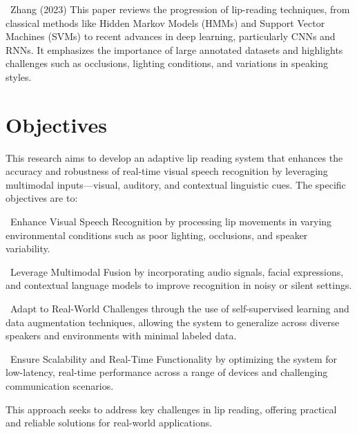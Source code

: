 \documentclass[conference]{IEEEtran}
\begin{document}
\ Zhang (2023) This paper reviews the progression of lip-reading techniques, from classical methods like Hidden Markov Models (HMMs) and Support Vector Machines (SVMs) to recent advances in deep learning, particularly CNNs and RNNs. It emphasizes the importance of large annotated datasets and highlights challenges such as occlusions, lighting conditions, and variations in speaking styles.


\section{Objectives}This research aims to develop an adaptive lip reading system that enhances the accuracy and robustness of real-time visual speech recognition by leveraging multimodal inputs—visual, auditory, and contextual linguistic cues. The specific objectives are to:

\ Enhance Visual Speech Recognition by processing lip movements in varying environmental conditions such as poor lighting, occlusions, and speaker variability.

\ Leverage Multimodal Fusion by incorporating audio signals, facial expressions, and contextual language models to improve recognition in noisy or silent settings.

\ Adapt to Real-World Challenges through the use of self-supervised learning and data augmentation techniques, allowing the system to generalize across diverse speakers and environments with minimal labeled data.

\ Ensure Scalability and Real-Time Functionality by optimizing the system for low-latency, real-time performance across a range of devices and challenging communication scenarios.

This approach seeks to address key challenges in lip reading, offering practical and reliable solutions for real-world applications.
\end{document}
